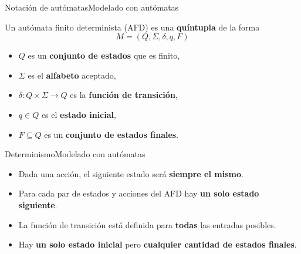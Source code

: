 \documentclass[spanish]{beamer}
\begin{document}
\begin{frame}{Notación de autómatas}{Modelado con autómatas}
    \begin{definition}
        Un \alert{autómata finito determinista} (AFD) es una \textbf{quíntupla} de la forma
        \[M = (Q, \Sigma, \delta, q, F)\] \pause
        \begin{itemize}
            \item $Q$ es un \textbf{conjunto de estados} que es finito, \pause
            \item $\Sigma$ es el \textbf{alfabeto} aceptado, \pause
            \item $\delta : Q \times \Sigma \to Q$ es la \textbf{función de transición}, \pause
            \item $q \in Q$ es el \textbf{estado inicial}, \pause
            \item $F \subseteq Q$ es un \textbf{conjunto de estados finales}.
        \end{itemize}
    \end{definition}
\end{frame}

\begin{frame}{Determinismo}{Modelado con autómatas}
    \begin{itemize}
        \itemsep1.5ex
        \item Dada una acción, el siguiente estado será \textbf{siempre el mismo}. \pause
        \item Para cada par de estados y acciones del AFD hay \textbf{un solo estado siguiente}. \pause
        \item La función de transición está definida para \textbf{todas} las entradas posibles. \pause
        \item Hay \textbf{un solo estado inicial} pero \textbf{cualquier cantidad de estados finales}.
    \end{itemize}
    
\end{frame}



\end{document}
